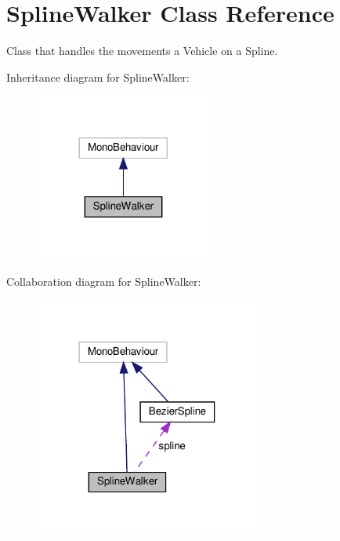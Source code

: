 \hypertarget{classSplineWalker}{}\section{Spline\+Walker Class Reference}
\label{classSplineWalker}


Class that handles the movements a Vehicle on a Spline.  




Inheritance diagram for Spline\+Walker\+:\nopagebreak
\begin{figure}[H]
\begin{center}
\leavevmode
\includegraphics[width=164pt]{classSplineWalker__inherit__graph}
\end{center}
\end{figure}


Collaboration diagram for Spline\+Walker\+:\nopagebreak
\begin{figure}[H]
\begin{center}
\leavevmode
\includegraphics[width=210pt]{classSplineWalker__coll__graph}
\end{center}
\end{figure}
